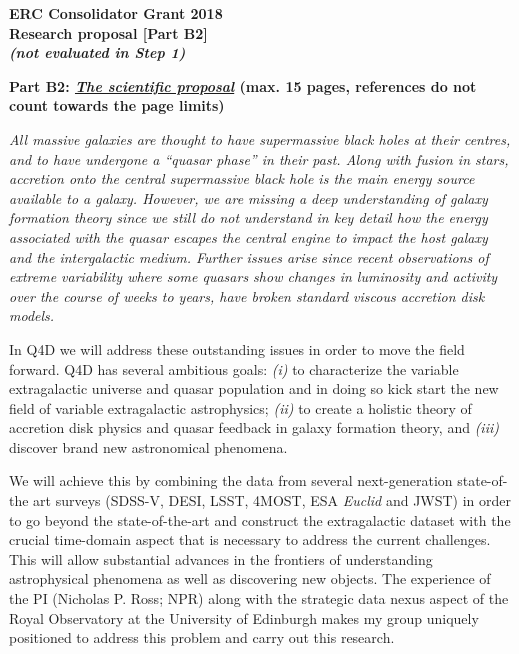 \documentclass[oneside, a4paper, onecolumn, 11pt]{article}
\begin{document}
\begin{center}
\large \textbf{ERC Consolidator Grant 2018} \\
\large \textbf{Research proposal [Part B2]}  \\
\large \textbf{\emph{(not evaluated in Step 1)}}
\end{center}


\noindent
\textbf{\textcolor{Cerulean}{Part B2: \emph{\underline{The scientific proposal}} (max. 15 pages, references do not count towards the page limits)}}\\

\noindent
{\it 
All massive galaxies are thought to have supermassive black holes at
their centres, and to have undergone a ``quasar phase'' in their
past. Along with fusion in stars, accretion onto the central
supermassive black hole is the main energy source available to a
galaxy. However, we are missing a deep understanding of galaxy
formation theory since we still do not understand in key detail how
the energy associated with the quasar escapes the central engine to
impact the host galaxy and the intergalactic medium. Further issues
arise since recent observations of extreme variability where some
quasars show changes in luminosity and activity over the course of
weeks to years, have broken standard viscous accretion disk models.

\smallskip
\smallskip
\noindent
In Q4D we will address these outstanding issues in order to move the
field forward.  Q4D has several ambitious goals: {\it (i)} to characterize
the variable extragalactic universe and quasar population and in doing
so kick start the new field of variable extragalactic astrophysics;
{\it (ii)} to create a holistic theory of accretion disk physics and
quasar feedback in galaxy formation theory, and {\it (iii)} discover
brand new astronomical phenomena.

\smallskip
\smallskip
\noindent
We will achieve this by combining the data from several
next-generation state-of-the art surveys (SDSS-V, DESI, LSST, 4MOST,
ESA {\it Euclid} and JWST) in order to go beyond the state-of-the-art
and construct the extragalactic dataset with the crucial time-domain
aspect that is necessary to address the current challenges.  This will
allow substantial advances in the frontiers of understanding
astrophysical phenomena as well as discovering new objects.  The
experience of the PI (Nicholas P. Ross; NPR) along with the strategic
data nexus aspect of the Royal Observatory at the University of
Edinburgh makes my group uniquely positioned to address this problem
and carry out this research.  }
\end{document}
